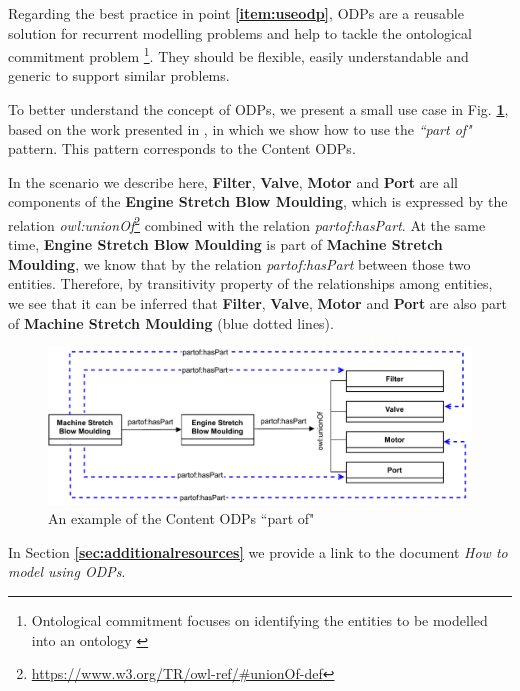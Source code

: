 \documentclass{guideline/sty/rapport}
\begin{document}
Regarding the best practice in point \textbf{\ref{item:useodp}}, \ac{ODPs} are a reusable solution for recurrent modelling problems \cite{Jaskolka15,Shimizu19} and help to tackle the ontological commitment problem \footnote{Ontological commitment focuses on identifying the entities to be modelled into an ontology \cite{RodriguezDoncel15}}. They should be flexible, easily understandable and generic to support similar problems. \singlespacing

To better understand the concept of \ac{ODPs}, we present a small use case in Fig. \textbf{ \ref{fig:odpexample}}, based on the work presented in \cite{Presutti08}, in which we show how to use the \textit{``part of"} pattern. This pattern corresponds to the Content \ac{ODPs}. \singlespacing

In the scenario we describe here, \textbf{Filter}, \textbf{Valve}, \textbf{Motor} and \textbf{Port} are all components of the \textbf{Engine Stretch Blow Moulding}, which is expressed by the relation \textit{owl:unionOf}\footnote{\url{https://www.w3.org/TR/owl-ref/\#unionOf-def}} combined with the relation \textit{partof:hasPart}. At the same time, \textbf{Engine Stretch Blow Moulding} is part of \textbf{Machine Stretch Moulding}, we know that by the relation \textit{partof:hasPart} between those two entities. Therefore, by transitivity property of the relationships among entities, we see that it can be inferred that \textbf{Filter},\textbf{ Valve}, \textbf{Motor} and \textbf{Port} are also part of \textbf{Machine Stretch Moulding} (blue dotted lines).\singlespacing

    \begin{figure}[H]
        \centering
          \includegraphics[width=1\textwidth]{images/ODPexample.pdf}
          \caption{An example of the Content \ac{ODPs} ``part of"}
        \label{fig:odpexample}
    \end{figure}
    
\begin{beware} [Note]
In Section \textbf{\ref{sec:additionalresources}} we provide a link to the document \textit{How to model using ODPs}. \singlespacing
\end{beware}
\end{document}
